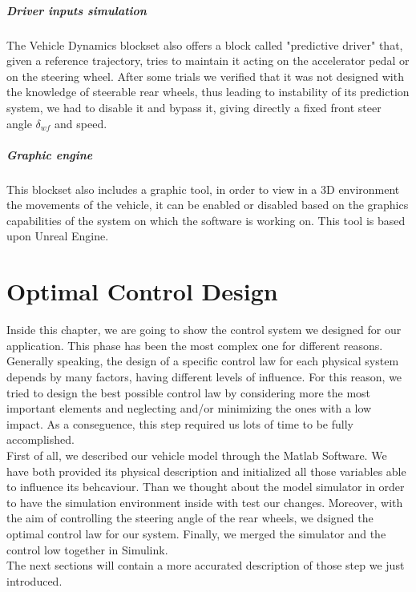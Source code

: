 \documentclass[a4paper,12pt,titlepage]{report}
\numberwithin{figure}{section}
\begin{document}
	\paragraph{Driver inputs simulation}
	The Vehicle Dynamics blockset also offers a block called "predictive driver" that, given a reference trajectory, tries to maintain it acting on the accelerator pedal or on the steering wheel. After some trials we verified that it was not designed with the knowledge of steerable rear wheels, thus leading to instability of its prediction system, we had to disable it and bypass it, giving directly a fixed front steer angle $\delta_{wf}$ and speed.
	\paragraph{Graphic engine}
	This blockset also includes a graphic tool, in order to view in a 3D environment the movements of the vehicle, it can be enabled or disabled based on the graphics capabilities of the system on which the software is working on. This tool is based upon Unreal Engine.
\chapter{Optimal Control Design}
Inside this chapter, we are going to show the control system we designed for our application. This phase has been the most complex one for different reasons. Generally speaking, the design of a specific control law for each physical system depends by many factors, having different levels of influence. For this reason, we tried to design the best possible control law by considering more the most important elements and neglecting and/or minimizing the ones with a low impact. As a conseguence, this step required us lots of time to be fully accomplished.\\
First of all, we described our vehicle model through the Matlab Software. We have both provided its physical description and initialized all those variables able to influence its behcaviour. Than we thought about the model simulator in order to have the simulation environment inside with test our changes. Moreover, with the aim of controlling the steering angle of the rear wheels, we dsigned the optimal control law for our system. Finally, we merged the simulator and the control low together in Simulink. \\
The next sections will contain a more accurated description of those step we just introduced.
\end{document}
